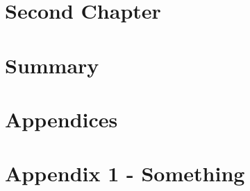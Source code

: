 \documentclass[12pt, a4paper]{report}
\begin{document}
    \chapter{Second Chapter}\label{ch:second_chapter}
    

    \chapter{Summary}\label{ch:summary}
    

    \pagebreak
    \printbibliography

    \pagebreak
    \appendix
    \chapter*{Appendices}
    \renewcommand{\thechapter}{\arabic{chapter}}

    \label{chapter:appendix-one}
    {\let\clearpage\relax\chapter*{Appendix 1 - Something}}
    
\end{document}
